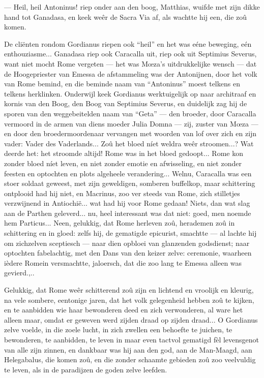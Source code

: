 \documentclass[a4paper, 12pt, oneside, dutch]{article}
\begin{document}
--- Heil, heil Antoninus! riep onder aan den boog, Matthias, wuifde met zijn dikke hand tot Ganadasa, en keek weêr de Sacra Via af, als wachtte hij een, die zoû komen.

De cliënten rondom Gordianus riepen ook "`heil"' en het was eéne beweging, eén enthouziasme... Ganadasa riep ook Caracalla uit, riep ook uit Septimius Severus, want niet mocht Rome vergeten --- het was Mœza's uitdrukkelijke wensch --- dat de Hoogepriester van Emessa de afstammeling was der Antonijnen, door het volk van Rome bemind, en die beminde naam van "`Antoninus"' moest telkens en telkens herklinken. Onderwijl keek Gordianus werktuigelijk op naar architraaf en kornis van den Boog, den Boog van Septimius Severus, en duidelijk zag hij de sporen van den weggebeitelden naam van "`Geta"' --- den broeder, door Caracalla vermoord in de armen van diens moeder Julia Domna --- zij, zuster van Mœza --- en door den broedermoordenaar vervangen met woorden van lof over zich en zijn vader: Vader des Vaderlands... Zoû het bloed níet weldra weêr stroomen...? Wat deerde het: het stroomde altijd! Rome was in het bloed gedoopt... Rome kon zonder bloed níet leven, en niet zonder emotie en afwisseling, en niet zonder feesten en optochten en plots algeheele verandering... Welnu, Caracalla was een stoer soldaat geweest, met zijn geweldigen, somberen buffelkop, maar schittering ontplooid had hij niet, en Macrinus, zoo ver steeds van Rome, zich stilletjes verzwijnend in Antiochië... wat had hij voor Rome gedaan! Niets, dan wat slag aan de Parthen geleverd... nu, heel interessant was dat niet: goed, men noemde hem Particus... Neen, gelukkig, dat Rome herleven zoû, herademen zoû in schittering en in gloed: zelfs hij, de gematigde epicurist, smachtte --- al lachte hij om zichzelven sceptiesch --- naar dien opbloei van glanzenden godsdienst; naar optochten fabelachtig, met den Dans van den keizer zelve: ceremonie, waarheen ièdere Romein versmachtte, jaloersch, dat die zoo lang te Emessa alleen was gevierd.,..

Gelukkig, dat Rome weêr schitterend zoû zijn en lichtend en vroolijk en kleurig, na vele sombere, eentonige jaren, dat het volk gelegenheid hebben zoû te kijken, en te aanbidden wie haar bewonderen deed en zich verwonderen, al ware het alleen maar, omdat er geweven werd zijden draad op zijden draad... O Gordianus zelve voelde, in die zoele lucht, in zich zwellen een behoefte te juichen, te bewonderen, te aanbidden, te leven in maar even tactvol gematigd fèl levensgenot van alle zijn zinnen, en dankbaar was hij aan den god, aan de Man-Maagd, aan Helegabalus, die komen zoû, en die zonder schaamte gebieden zoû zoo veelvuldig te leven, als in de paradijzen de goden zelve leefden.
\end{document}
